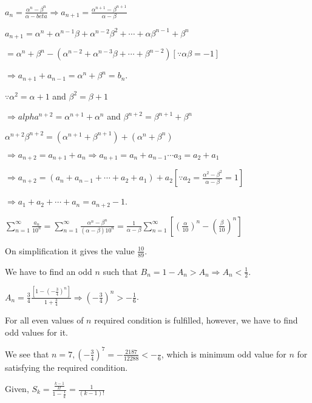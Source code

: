     $a_n = \frac{\alpha^n - \beta^n}{\alpha - beta} \Rightarrow a_{n + 1} = \frac{\alpha^{n + 1} - \beta^{n
      + 1}}{\alpha - \beta}$

    $a_{n + 1} = \alpha^n + \alpha^{n - 1}\beta + \alpha^{n - 2}\beta^2 + \cdots + \alpha\beta^{n - 1}
    + \beta^n$

    $= \alpha^n + \beta^n - \left(\alpha^{n - 2} + \alpha^{n - 3}\beta + \cdots + \beta^{n -
      2}\right)[\because \alpha\beta = -1]$

    $\Rightarrow a_{n + 1} + a_{n - 1} = \alpha^n + \beta^n = b_n$.
  \item $\because \alpha^2 = \alpha + 1$ and $\beta^2 = \beta + 1$

    $\Rightarrow alpha^{n + 2} = \alpha^{n + 1} + \alpha^n$ and $\beta^{n + 2} = \beta^{n + 1} + \beta^n$

    $\alpha^{n + 2}\beta^{n + 2} = (\alpha^{n + 1} + \beta^{n + 1}) + (\alpha^n + \beta^n)$

    $\Rightarrow a_{n + 2} = a_{n + 1} + a_n\Rightarrow a_{n + 1} = a_n + a_{n - 1} \cdots a_3 = a_2 + a_1$

    $\Rightarrow a_{n + 2} = (a_n + a_{n - 1} + \cdots + a_2 + a_1) + a_2[\because a_2 = \frac{\alpha^2
      - \beta^2}{\alpha - \beta} = 1]$

    $\Rightarrow a_1 + a_2 + \cdots + a_n = a_{n + 2} - 1$.
  \item $\displaystyle\sum_{n = 1}^\infty\frac{a_n}{10^n} = \sum_{n = 1}^\infty\frac{\alpha^n
    - \beta^n}{(\alpha -\beta)10^n} = \frac{1}{\alpha - \beta}\sum_{n =
    1}^\infty\left[\left(\frac{\alpha}{10}\right)^n - \left(\frac{\beta}{10}\right)^n\right]$

    On simplification it gives the value $\frac{10}{89}$.
  \stopitemize
\item We have to find an odd $n$ such that $B_n = 1 - A_n > A_n \Rightarrow A_n < \frac{1}{2}$.

  $A_n = \frac{3}{4}\frac{\left[1 - \left(-\frac{3}{4}\right)^n\right]}{1
  + \frac{3}{4}}\Rightarrow \left(-\frac{3}{4}\right)^n > -\frac{1}{6}$.

  For all even values of $n$ required condition is fulfilled, however, we have to find odd values for it.

  We see that $n = 7, \left(-\frac{3}{4}\right)^7 = -\frac{2187}{12288} < -\frac{}{6}$, which is minimum
  odd value for $n$ for satisfying the required condition.
\item Given, $S_k = \frac{\frac{k - 1}{k!}}{1- \frac{1}{k}} = \frac{1}{(k - 1)!}$

